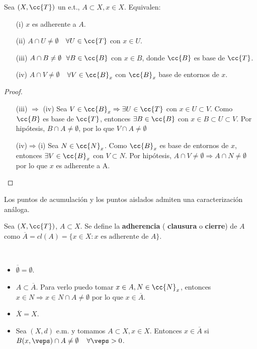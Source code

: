 \begin{prop}
    Sea $(X, \cc{T})$ un e.t., $A\subset X, x \in X$. Equivalen:
    \begin{enumerate}
        \item[(i)] $x$ es adherente a $A$.
        \item[(ii)] $A\cap U \neq \emptyset$\ \ $\forall U \in \cc{T}$ con $x\in U$.
        \item[(iii)] $A \cap B \neq \emptyset \ \ \forall B \in \cc{B}$ con $x\in B$, donde $\cc{B}$ es base de $\cc{T}$.
        \item[(iv)] $A\cap V \neq \emptyset$\ \ $\forall V \in \cc{B}_x$ con $\cc{B}_x$ base de entornos de $x$.  
    \end{enumerate}

    \begin{proof}\
        \begin{itemize}
            \item[(iii) $\Rightarrow$ (iv)] Sea $V\in \cc{B}_x\Rightarrow \exists U \in \cc{T}$ con $x\in U \subset V$. Como $\cc{B}$ es base de $\cc{T}$, entonces $\exists B\in \cc{B}$ con $x\in B\subset U \subset V$. Por hipótesis, $B\cap A \neq \emptyset$, por lo que $V\cap A \neq \emptyset$
            \item[(iv)$\Rightarrow$(i)] Sea $N \in \cc{N}_x$. Como $\cc{B}_x$ es base de entornos de $x$, entonces $\exists V \in \cc{B}_x$ con $V\subset N$. Por hipótesis, $A\cap V\neq \emptyset \Rightarrow A\cap N \neq \emptyset$ por lo que $x$ es adherente a A.
        \end{itemize}
    \end{proof}
\end{prop}

\begin{observacion}
    Los puntos de acumulación y los puntos aislados admiten una caracterización análoga. %
    \endsquare
\end{observacion}

\begin{definicion}
    Sea $(X, \cc{T})$, $A\subset X$. Se define la \textbf{adherencia} ( \textbf{clausura} o \textbf{cierre}) de $A$ como $\overline{A}=cl(A)=\{x\in X : x \text{ es adherente de } A\}$.
    \endsquare
\end{definicion}

\begin{ejemplo}\
    \begin{itemize}
        \item $\overline{\emptyset} = \emptyset$.
        \item $A\subset \overline{A}$. Para verlo puedo tomar $x\in A, N  \in \cc{N}_x$, entonces $x\in N\Rightarrow x \in N\cap A \neq \emptyset$ por lo que $x\in \overline{A}$.
        \item $\overline{X} = X$.
        \item Sea $(X,d)$ e.m. y tomamos $A\subset X, x \in X$. Entonces $x\in \overline{A}$ si $B(x,\veps)\cap A \neq \emptyset$\ \ $\forall \veps >0$.
    \end{itemize}
    \endsquare
\end{ejemplo}

